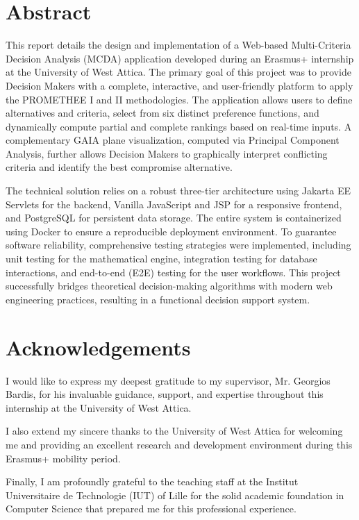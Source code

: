 \documentclass[12pt,a4paper,oneside]{report}
\begin{document}
\chapter*{Abstract}
This report details the design and implementation of a Web-based Multi-Criteria Decision Analysis (MCDA) application developed during an Erasmus+ internship at the University of West Attica. The primary goal of this project was to provide Decision Makers with a complete, interactive, and user-friendly platform to apply the PROMETHEE I and II methodologies. The application allows users to define alternatives and criteria, select from six distinct preference functions, and dynamically compute partial and complete rankings based on real-time inputs. A complementary GAIA plane visualization, computed via Principal Component Analysis, further allows Decision Makers to graphically interpret conflicting criteria and identify the best compromise alternative.

The technical solution relies on a robust three-tier architecture using Jakarta EE Servlets for the backend, Vanilla JavaScript and JSP for a responsive frontend, and PostgreSQL for persistent data storage. The entire system is containerized using Docker to ensure a reproducible deployment environment. To guarantee software reliability, comprehensive testing strategies were implemented, including unit testing for the mathematical engine, integration testing for database interactions, and end-to-end (E2E) testing for the user workflows. This project successfully bridges theoretical decision-making algorithms with modern web engineering practices, resulting in a functional decision support system.

\cleardoublepage
\chapter*{Acknowledgements}
I would like to express my deepest gratitude to my supervisor, Mr. Georgios Bardis, for his invaluable guidance, support, and expertise throughout this internship at the University of West Attica. 

I also extend my sincere thanks to the University of West Attica for welcoming me and providing an excellent research and development environment during this Erasmus+ mobility period. 

Finally, I am profoundly grateful to the teaching staff at the Institut Universitaire de Technologie (IUT) of Lille for the solid academic foundation in Computer Science that prepared me for this professional experience.
\end{document}
